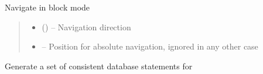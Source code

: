 \documentclass[letterpaper,10pt,english]{sphinxmanual}
\begin{document}
\begin{savenotes}
\begin{fulllineitems}
\begin{savenotes}\begin{fulllineitems}
\label{\detokenize{eezz:eezz.database.TDatabaseTable.navigate}}
\pysigstartsignatures
{}
\pysigstopsignatures
\sphinxAtStartPar
Navigate in block mode
\begin{quote}\begin{description}
\begin{itemize}
\item {} 
\sphinxAtStartPar
{} ({\hyperref[\detokenize{eezz:eezz.table.TNavigation}]{}}) – Navigation direction

\item {} 
\sphinxAtStartPar
{} – Position for absolute navigation, ignored in any other case

\end{itemize}

\end{description}\end{quote}

\end{fulllineitems}\end{savenotes}


\begin{savenotes}\begin{fulllineitems}
\label{\detokenize{eezz:eezz.database.TDatabaseTable.prepare_statements}}
\pysigstartsignatures
{}
\pysigstopsignatures
\sphinxAtStartPar
Generate a set of consistent database statements for

\end{fulllineitems}\end{savenotes}


\end{fulllineitems}\end{savenotes}
\end{document}
